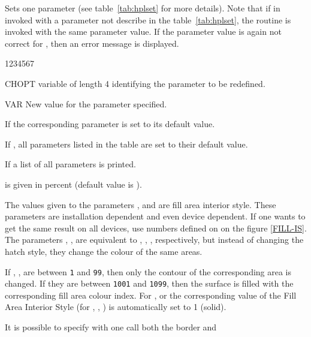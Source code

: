 \newpage

\Action
Sets one \HPLOT{} parameter (see table~\ref{tab:hplset} for more details). Note
that if  in invoked with a parameter not describe in the 
table~\ref{tab:hplset}, the \HIGZ{} routine  is invoked with the 
same parameter value. If the parameter value is again not correct for 
, then an error message is displayed.
\Pdesc
\begin{DLtt}{1234567}
\item[CHOPT] \CHARACTER{} variable of length 4 identifying the parameter to be 
             redefined.
\item[VAR]   New value for the parameter specified.
\end{DLtt}

\Remarks
\begin{UL}
\item If  the corresponding parameter is set to its default value.
\item If , all parameters listed in the table are set to 
      their default value.
\item If  a list of all parameters is printed.
\item {} is given in percent (default value is ).
\item The values given to the parameters ,  and 
       are fill area interior style. These parameters are 
      installation dependent and even device dependent. If one wants to get the
      same result on all devices, use numbers defined on on the figure 
      \ref{FILL-IS}. The parameters , ,  are 
      equivalent to , , , respectively, but 
      instead of changing the hatch style, they change the colour of the same 
      areas.
\item If , ,  are between {\tt1} and {\tt99},
      then only the contour of the corresponding area is changed. If they are 
      between {\tt1001} and {\tt1099}, then the surface is filled with the 
      corresponding fill area colour index. For ,  or
       the corresponding value of the Fill Area Interior Style 
      (for , , ) is automatically set to 1 
      (solid).
\item It is possible to specify with one  call both the border and

\end{UL}
